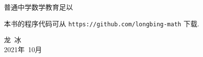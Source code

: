 普通中学数学教育足以


本书的程序代码可从 \verb|https://github.com/longbing-math| 下载.


{\kaishu
	\begin{center}
		\hspace*{88mm}龙\,   冰\\
		\hspace*{88mm}2021年~10月
	\end{center}
}

%

